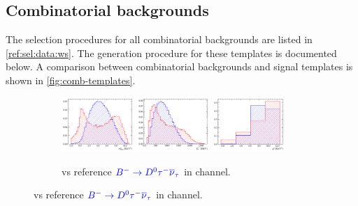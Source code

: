 \subsection{Combinatorial backgrounds}
\label{ref:fit:tmpl:comb}

The selection procedures for all combinatorial backgrounds are listed
in \cref{ref:sel:data:ws}.
The generation procedure for these templates is documented below.
A comparison between combinatorial backgrounds and signal templates is
shown in \cref{fig:comb-templates}.

\begin{figure}[!htb]
    \begin{subfigure}[t]{\textwidth}
        \centering
        \includegraphics[width=0.3\textwidth]{figs-fit-fit-templates/histo-comp/D0_iso_D0Tau__vs__D0_iso_BComb__m2miss.pdf}
        \includegraphics[width=0.3\textwidth]{figs-fit-fit-templates/histo-comp/D0_iso_D0Tau__vs__D0_iso_BComb__el.pdf}
        \includegraphics[width=0.3\textwidth]{figs-fit-fit-templates/histo-comp/D0_iso_D0Tau__vs__D0_iso_BComb__q2.pdf}
        \caption{
            \textcolor{red}{\BComb} vs
            reference
            $\textcolor{blue}{{{{B}^-}} \rightarrow {\ensuremath{{D}^0}}{\ensuremath{\tau^-}}{\ensuremath{{\overline{\nu}}_\tau}}}$
            in \Dz channel.
        }
    \end{subfigure}


\end{figure}
